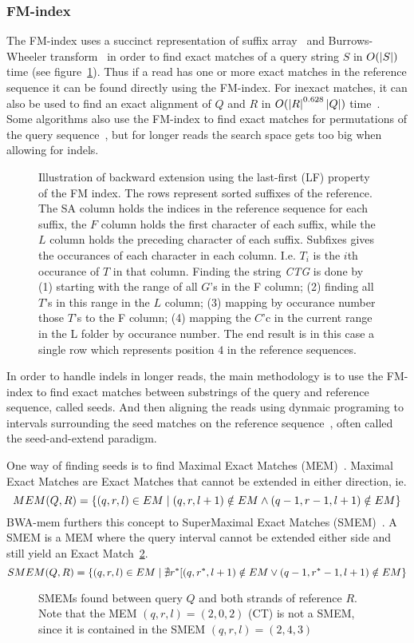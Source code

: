\subsubsection{FM-index}
The FM-index uses a succinct representation of suffix array~\cite{suffixarray} and Burrows-Wheeler transform~\cite{BWT} in order to find exact matches of a query string $S$ in $O(\left|S\right|)$ time (see figure~\ref{fig:FM}).
Thus if a read has one or more exact matches in the reference sequence it can be found directly using the FM-index.
For inexact matches, it can also be used to find an exact alignment of $Q$ and $R$ in $O(\left|R\right|^{0.628}\left|Q\right|)$ time~\cite{bwtsw,bwalong}.
Some algorithms also use the FM-index to find exact matches for permutations of the query sequence~\cite{bowtie1, bwashort}, but for longer reads the search space gets too big when allowing for indels.
\begin{figure}
  \tikzpicture
  
  \endtikzpicture
  \label{fig:FM}
  \caption{Illustration of backward extension using the last-first (LF) property of the FM index.
    The rows represent sorted suffixes of the reference. The SA column holds the indices in the reference sequence for each suffix, the $F$ column holds the first character of each suffix, while the $L$ column holds the preceding character of each suffix. Subfixes gives the occurances of each character in each column. I.e. $T_i$ is the $i$th occurance of $T$ in that column. Finding the string \emph{CTG} is done by (1) starting with the range of all $G$'s in the F column; (2) finding all $T$'s in this range in the $L$ column; (3) mapping by occurance number those $T$'s to the F column; (4) mapping the $C$'c in the current range in the L folder by occurance number. The end result is in this case a single row which represents position $4$ in the reference sequences. 
}
\end{figure}

In order to handle indels in longer reads, the main methodology is to use the FM-index to find exact matches between substrings of the query and reference sequence, called seeds.
And then aligning the reads using dynmaic programing to intervals surrounding the seed matches on the reference sequence~\cite{bowtie2}, often called the seed-and-extend paradigm.

One way of finding seeds is to find Maximal Exact Matches (MEM)~\cite{longmem, origmem}.
Maximal Exact Matches are Exact Matches that cannot be extended in either direction, ie. 
\[
  MEM(Q, R) = \left\{(q, r, l) \in EM \mid (q, r, l+1) \notin EM \wedge (q-1, r-1, l+1) \notin EM\right\}
\]
BWA-mem furthers this concept to SuperMaximal Exact Matches (SMEM)~\cite{origsmem}.
A SMEM is a MEM where the query interval cannot be extended either side and still yield an Exact Match~\ref{fig:smem}.
\[
  SMEM(Q, R) = \left\{(q, r, l) \in EM \mid \nexists r^*[(q, r^*, l+1) \notin EM \vee (q-1, r^*-1, l+1) \notin EM\right\}
\]
\begin{figure}
  \tikzpicture
  
  \endtikzpicture
  \label{fig:smem}
  \caption{SMEMs found between query $Q$ and both strands of reference $R$. Note that the MEM $(q, r, l)=(2, 0, 2)$ (CT) is not a SMEM, since it is contained in the SMEM $(q, r, l) = (2, 4, 3)$}
\end{figure}

